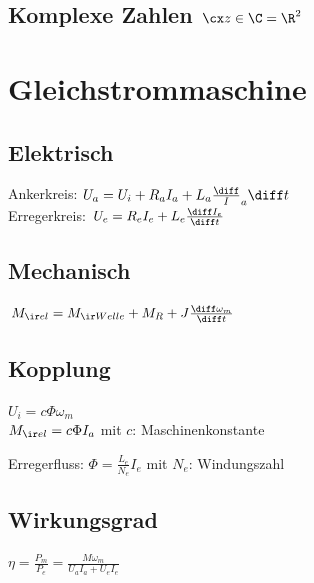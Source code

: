 \documentclass[fs, german]{latex4ei_fs}
\begin{document}
\begin{sectionbox}
\subsection{Komplexe Zahlen $\cx z \in \C = \R^2$}
 \quad
{}


\end{sectionbox}
\section{Gleichstrommaschine}

\begin{sectionbox}

\subsection*{Elektrisch}

Ankerkreis: $U_a = U_i + R_a I_a + L_a \frac \diff I_a \diff t$ \\
Erregerkreis: $U_e = R_e I_e + L_e \frac{\diff I_e}{\diff t}$

\subsection*{Mechanisch}
$M_{\ir el} = M_{\ir Welle} + M_R + J \frac{\diff \omega_m}{\diff t}$

\subsection*{Kopplung}
$U_i = c \Phi \omega_m$ \\
$M_{\ir el} = c \Phi I_a$ \quad mit $c$: Maschinenkonstante

Erregerfluss: $\Phi = \frac{L_e}{N_e} I_e$ \quad mit $N_e$: Windungszahl


\subsection*{Wirkungsgrad}
$\eta = \frac{P_m}{P_e} = \frac{M \omega_m}{U_a I_a + U_e I_e}$
\end{sectionbox}
\end{document}
